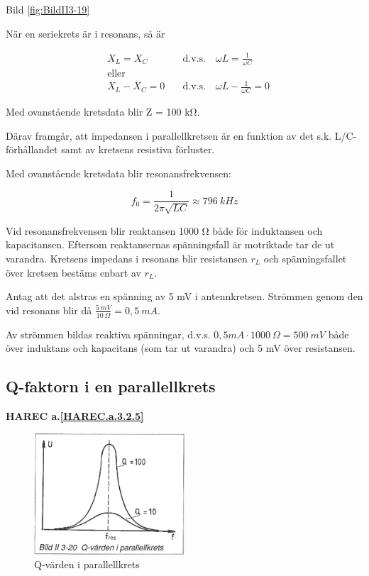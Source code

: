 Bild \ref{fig:BildII3-19}

När en seriekrets är i resonans, så är

\begin{align*}
& X_L = X_C \quad & \text{d.v.s.} \quad \omega L = \frac{1}{\omega C} \\
& \text{eller} & \\
& X_L - X_C = 0 \quad & \text{d.v.s.} \quad \omega L - \frac{1}{\omega C} = 0
\end{align*}

Med ovanstående kretsdata blir Z = 100 kΩ.

Därav framgår, att impedansen i parallellkretsen är en funktion av det s.k.
L/C-förhållandet samt av kretsens resistiva förluster.

Med ovanstående kretsdata blir resonansfrekvensen:

\[
f_0 = \frac{1}{2π\sqrt{LC}} \approx 796\ kHz
\]

Vid resonansfrekvensen blir reaktansen 1000 Ω både för induktansen och
kapacitansen. Eftersom reaktansernas spänningsfall är motriktade tar de ut
varandra. Kretsens impedans i resonans blir resistansen \(r_L\) och
spänningsfallet över kretsen bestäms enbart av \(r_L\).

Antag att det alstras en spänning av 5 mV i antennkretsen. Strömmen genom den
vid resonans blir då \(\frac{5\ mV}{10\ Ω} = 0,5\ mA\).

Av strömmen bildas reaktiva spänningar, d.v.s.
\(0,5 mA \cdot 1000\ Ω = 500\ mV\) både över induktans och kapacitans (som tar
ut varandra) och 5 mV över resistansen.

\subsection{Q-faktorn i en parallellkrets}
\textbf{HAREC a.\ref{HAREC.a.3.2.5}\label{myHAREC.a.3.2.5}}
\label{Q-faktor}

\begin{figure}
\includegraphics[width=0.5\textwidth]{images/bild_2_3-20}
\caption{Q-värden i parallellkrets}
\label{fig:BildII3-20}
\end{figure}

